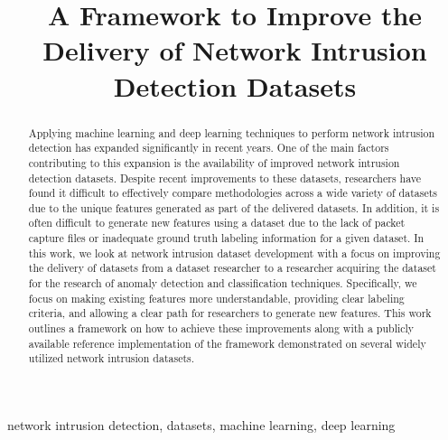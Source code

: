 \documentclass[conference]{IEEEtran}
\begin{document}
\title{A Framework to Improve the Delivery of Network Intrusion Detection Datasets}

\author{
\and
{}
}

\maketitle

\begin{abstract}
    Applying machine learning and deep learning techniques to perform network intrusion detection has expanded significantly in recent years.
    One of the main factors contributing to this expansion is the availability of improved network intrusion detection datasets.
    Despite recent improvements to these datasets, researchers have found it difficult to effectively compare methodologies across a wide variety of datasets due to the unique features generated as part of the delivered datasets.
    In addition, it is often difficult to generate new features using a dataset due to the lack of packet capture files or inadequate ground truth labeling information for a given dataset.
    In this work, we look at network intrusion dataset development with a focus on improving the delivery of datasets from a dataset researcher to a researcher acquiring the dataset for the research of anomaly detection and classification techniques.
    Specifically, we focus on making existing features more understandable, providing clear labeling criteria, and allowing a clear path for researchers to generate new features.
    This work outlines a framework on how to achieve these improvements along with a publicly available reference implementation of the framework demonstrated on several widely utilized network intrusion datasets.
\end{abstract}

\begin{IEEEkeywords}
network intrusion detection, datasets, machine learning, deep learning
\end{IEEEkeywords}
\end{document}
